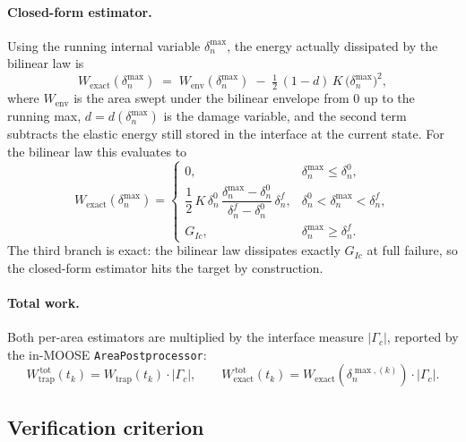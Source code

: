 \paragraph{Closed-form estimator.}
Using the running internal variable $\delta_n^{\max}$, the energy actually
dissipated by the bilinear law is
\begin{equation}
W_{\text{exact}}(\delta_n^{\max})
\;=\;
W_{\text{env}}(\delta_n^{\max})
\;-\; \tfrac{1}{2}\,(1-d)\,K\,\bigl(\delta_n^{\max}\bigr)^{2},
\label{eq:Wexact}
\end{equation}
where $W_{\text{env}}$ is the area swept under the bilinear envelope from
$0$ up to the running max, $d=d(\delta_n^{\max})$ is the damage variable,
and the second term subtracts the elastic energy still stored in the
interface at the current state. For the bilinear law this evaluates to
\begin{equation}
W_{\text{exact}}(\delta_n^{\max}) =
\begin{cases}
0,
& \delta_n^{\max} \le \delta_n^{0}, \\[6pt]
\dfrac{1}{2}\,K\,\delta_n^{0}\,
\dfrac{\delta_n^{\max}-\delta_n^{0}}{\delta_n^{f}-\delta_n^{0}}\,\delta_n^{f},
& \delta_n^{0}<\delta_n^{\max}<\delta_n^{f}, \\[12pt]
G_{Ic},
& \delta_n^{\max} \ge \delta_n^{f}.
\end{cases}
\label{eq:Wexact_piecewise}
\end{equation}
The third branch is exact: the bilinear law dissipates exactly $G_{Ic}$ at
full failure, so the closed-form estimator hits the target by construction.

\paragraph{Total work.}
Both per-area estimators are multiplied by the interface measure
$|\Gamma_c|$, reported by the in-MOOSE \texttt{AreaPostprocessor}:
\begin{equation}
W^{\,\text{tot}}_{\!\text{trap}}(t_k) = W_{\text{trap}}(t_k)\cdot|\Gamma_c|,
\qquad
W^{\,\text{tot}}_{\!\text{exact}}(t_k) = W_{\text{exact}}(\delta_n^{\max,(k)})\cdot|\Gamma_c|.
\end{equation}

\subsection{Verification criterion}

